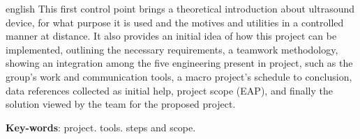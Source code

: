 \begin{resumo}[Abstract]
 \begin{otherlanguage*}{english}
   This first control point brings a theoretical introduction about ultrasound device, for what purpose it is used and the motives and utilities in a controlled manner at distance. It also provides an initial idea of how this project can be implemented, outlining the necessary requirements, a teamwork methodology, showing an integration among the five engineering present in project, such as the group’s work and communication tools, a macro project’s schedule to conclusion, data references collected as initial help, project scope (EAP), and finally the solution viewed by the team for the proposed project.    

   \vspace{\onelineskip}
 
   \noindent 
   \textbf{Key-words}: project. tools. steps and scope.
 \end{otherlanguage*}
\end{resumo}
